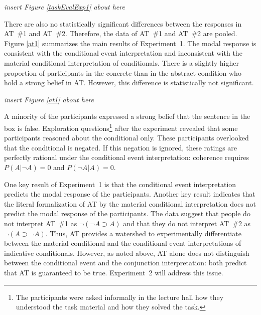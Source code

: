 \documentclass[11pt]{article}
\begin{document}
\dotfill

\dotfill \emph{insert Figure
\ref{taskEvalExp1} about here} \dotfill

\dotfill









There are also no statistically significant differences between the
responses in AT~\#1 and AT~\#2. Therefore, the data of AT~\#1 and
AT~\#2 are pooled. Figure \ref{at1} summarizes the main results of
Experiment~1. The modal response is consistent with the conditional
event interpretation and inconsistent with the material conditional
interpretation of conditionals.  There is a slightly higher proportion of
participants in the concrete  than in the abstract condition who hold a
strong belief in AT. However, this
difference is statistically not significant.

\dotfill

\dotfill \emph{insert Figure
\ref{at1} about here} \dotfill

\dotfill


A minority of the participants expressed a strong belief that the
sentence in the box is false. Exploration questions\footnote{The
  participants were asked informally in the lecture hall how they
  understood the task material and how they solved the task.} after
the experiment revealed that some participants reasoned about the
conditional only. These participants overlooked that the conditional
is negated. If this negation is ignored, these ratings are perfectly
rational under the conditional event interpretation: coherence
requires $P(A|\neg A)=0$ and $P(\neg A|A)=0$.


One key result of Experiment~1 is that the conditional event
interpretation predicts the modal response of the
participants. Another key result indicates that the literal
formalization of AT by the material conditional interpretation does
not predict the modal response of the participants. The data suggest
that people do not interpret AT~\#1 as $\neg(\neg A \supset A)$ and
that they do not interpret AT~\#2 as $\neg(A \supset \neg A)$. Thus,
AT provides a watershed to experimentally differentiate between the
material conditional and the conditional event interpretations of
indicative conditionals. However, as noted above, AT alone does not
distinguish between the conditional event and the conjunction
interpretation: both predict that AT is guaranteed to be
true. Experiment~2 will address this issue.
\end{document}
